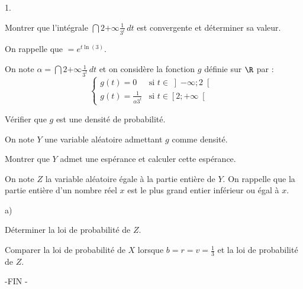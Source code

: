 \documentclass[11pt]{article}%
\begin{document}
\begin{noliste}{1.}
 \setlength{\itemsep}{4mm}
\item Montrer que l'intégrale $\dint{2}{+ \infty }\frac{1}{3^{t}}\,dt$
est convergente et déterminer sa
valeur.

On rappelle que $ = e^{t\ln \left( 3\right) }$.

On note $\alpha = \dint{2}{+ \infty }\frac{1}{3^{t}}\,dt$ et on
considère la fonction $g$ définie sur $\R$ par : 
\[
\left\{ 
\begin{array}{cc}
g\left( t\right) = 0 & \text{si }t\in \left] -\infty ;2\right[ \ \\
g\left( t\right) =  \frac{1}{\alpha 3^{t}} & \text{si }t\in \left[ 2; +
\infty \right[
\end{array}
\right. 
\]

\item Vérifier que $g$ est une densité de probabilité.

On note $Y$ une variable aléatoire admettant $g$ comme densité.

\item Montrer que $Y$ admet une espérance et calculer cette espérance.

\item On note $Z$ la variable aléatoire égale à la partie entière de
$Y$. On rappelle que la partie entière d'un nombre réel $x
$ est le plus grand entier inférieur ou égal à $x$.

\begin{noliste}{a)}
 \setlength{\itemsep}{2mm}
\item Déterminer la loi de probabilité de $Z$.

\item Comparer la loi de probabilité de $X$ lorsque $b = r = v =
\frac{1}{3}$ et la loi de probabilité de $Z$.
\end{noliste}
\end{noliste}

\begin{center}
-FIN -
\end{center}
\end{document}
